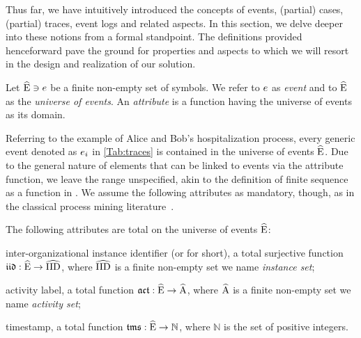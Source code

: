 \begin{newj}
Thus far, we have intuitively introduced the concepts of events, (partial) cases, (partial) traces, event logs and related aspects.
In this section, we delve deeper into these notions from a formal standpoint. The definitions provided henceforward pave the ground for properties and aspects to which we will resort in the design and realization of our solution.

\begin{definition}[Event]\label{def:evt}
	Let $\widehat{\mathrm{E}} \ni e$ be a finite non-empty set of symbols. We refer to $e$ as \emph{event} and to $\widehat{\mathrm{E}}$ as the \emph{universe of events}.
	An \emph{attribute} is a function having the universe of events as its domain.
\end{definition}
%
Referring to the example of Alice and Bob's hospitalization process, every generic event denoted as $e_i$ in \cref{Tab:traces} is contained in the universe of events $\widehat{\mathrm{E}}$.
Due to the general nature of elements that can be linked to events via the attribute function, we leave the range unspecified, akin to the definition of finite sequence as a function in \cite{Mendelson/2015:IntroductionMathematicalLogic}. We assume the following attributes as mandatory, though, as in the classical process mining literature~\cite{Aalst/2016:ProcessMiningBook:DataScienceinAction}.
%
\begin{assumption}\label{asm:attribute}
	The following attributes are total on the universe of events $\widehat{\mathrm{E}}$:
	\begin{inparadesc}
		\item[inter-organizational instance identifier] (or {\CId} for short), a total surjective function $\mathfrak{iid} : \widehat{\mathrm{E}} \to \widehat{\mathrm{IID}}$, where $\widehat{\mathrm{IID}}$ is a finite non-empty set we name \emph{instance set};
		\item[activity label\textnormal{,}] a total function $\mathfrak{act} : \widehat{\mathrm{E}} \to \widehat{\mathrm{A}}$, where $\widehat{\mathrm{A}}$ is a finite non-empty set we name \emph{activity set};
		\item[timestamp\textnormal{,}] a total function $\mathfrak{tms} : \widehat{\mathrm{E}} \to \mathbb{N}$, where $\mathbb{N}$ is the set of positive integers.
	\end{inparadesc}
\end{assumption}

\end{newj}
